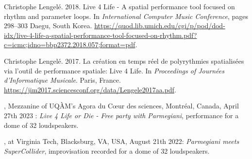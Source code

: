 \documentclass[10pt,a4paper]{article}
\begin{document}
\vspace{0.6em}  

\noindent Christophe Lengelé. 2018. Live 4 Life - A spatial performance tool focused on rhythm and parameter loops. In \textit{International Computer Music Conference}, pages 298–303 Daegu, South Korea. {\href{https://quod.lib.umich.edu/cgi/p/pod/dod-idx/live-4-life-a-spatial-performance- tool-focused-on-rhythm.pdf?c=icmc;idno=bbp2372.2018.057;format=pdf}{https://quod.lib.umich.edu/cgi/p/pod/dod-idx/live-4-life-a-spatial-performance-tool-focused-on-rhythm.pdf?c=icmc;idno=bbp2372.2018.057;format=pdf}}.

\vspace{0.6em}  

\noindent Christophe Lengelé. 2017. La création en temps réel de polyrythmies spatialisées via l’outil de performance spatiale: Live 4 Life. In \textit{Proceedings of Journées d’Informatique Musicale}. Paris, France. {\href{https://jim2017.sciencesconf.org/data/Lengele2017aa.pdf}{https://jim2017.sciencesconf.org/data/Lengele2017aa.pdf}}.



\spacedhrule{1em}{-0.4em}


\vspace{0.4em}  

, Mezzanine of UQÀM's Agora du Cœur des sciences, Montréal, Canada, April 27th 2023 : \textit{Live 4 Life or Die - Free party with Parmegiani}, performance for a dome of 32 loudspeakers.

\vspace{0.6em}  

, at Virginia Tech, Blacksburg, VA, USA, August 21th 2022: \textit{Parmegiani meets SuperCollider}, improvisation recorded for a dome of 32 loudspeakers.

\vspace{0.6em}  
\end{document}
